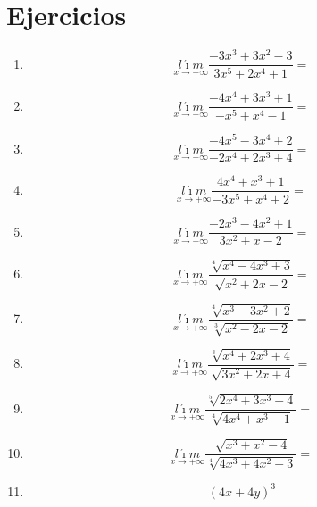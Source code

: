 \documentclass[oneside,spanish,letter]{article}
\begin{document}
\section{Ejercicios}
\begin{enumerate}
 \item $$\underset{x\rightarrow +\infty}{l\acute{\imath}m} \frac{-3x^3+3x^2-3}{3x^5+2x^4+1}=$$
 \item $$\underset{x\rightarrow +\infty}{l\acute{\imath}m} \frac{-4x^4+3x^3+1}{-x^5+x^4-1}=$$
 \item $$\underset{x\rightarrow +\infty}{l\acute{\imath}m} \frac{-4x^5-3x^4+2}{-2x^4+2x^3+4}=$$
 \item $$\underset{x\rightarrow +\infty}{l\acute{\imath}m} \frac{4x^4+x^3+1}{-3x^5+x^4+2}=$$
 \item $$\underset{x\rightarrow +\infty}{l\acute{\imath}m} \frac{-2x^3-4x^2+1}{3x^2+x-2}=$$
 \item $$\underset{x\rightarrow +\infty}{l\acute{\imath}m} \frac{\sqrt[4]{x^4-4x^3+3}}{\sqrt[]{x^2+2x-2}}=$$
 \item $$\underset{x\rightarrow +\infty}{l\acute{\imath}m} \frac{\sqrt[4]{x^3-3x^2+2}}{\sqrt[3]{x^2-2x-2}}=$$
 \item $$\underset{x\rightarrow +\infty}{l\acute{\imath}m} \frac{\sqrt[3]{x^4+2x^3+4}}{\sqrt[]{3x^2+2x+4}}=$$
 \item $$\underset{x\rightarrow +\infty}{l\acute{\imath}m} \frac{\sqrt[5]{2x^4+3x^3+4}}{\sqrt[4]{4x^4+x^3-1}}=$$
 \item $$\underset{x\rightarrow +\infty}{l\acute{\imath}m} \frac{\sqrt[]{x^3+x^2-4}}{\sqrt[4]{4x^3+4x^2-3}}=$$
\item $$(4x+4y)^3$$
 \end{enumerate}
  \newpage
\end{document}
